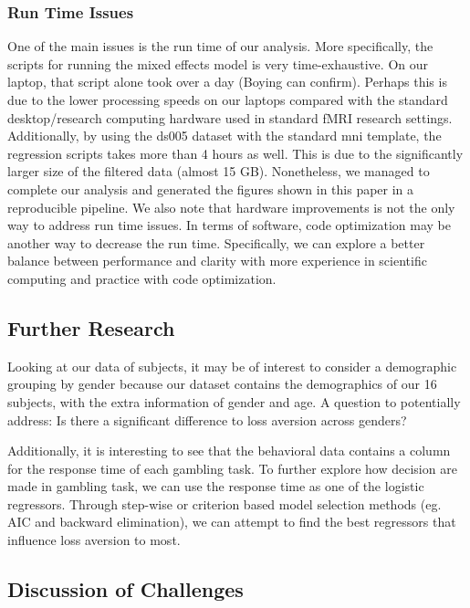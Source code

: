 \documentclass[11pt]{article}
\begin{document}
\subsubsection{Run Time Issues}

One of the main issues is the run time of our analysis. More specifically, 
the scripts for running the mixed effects model is very time-exhaustive. On
our laptop, that script alone took over a day (Boying can confirm). Perhaps
this is due to the lower processing speeds on our laptops compared with the
standard desktop/research computing hardware used in standard fMRI research
settings. Additionally, by using the ds005 dataset with the standard mni 
template, the regression scripts takes more than 4 hours as well. This is due
to the significantly larger size of the filtered data (almost 15 GB). 
Nonetheless, we managed to complete our analysis and generated the figures 
shown in this paper in a reproducible pipeline. We also note that hardware 
improvements is not the only way to address run time issues. In terms of 
software, code optimization may be another way to decrease the run time. 
Specifically, we can explore a better balance between performance and clarity
with more experience in scientific computing and practice with code 
optimization.

\subsection{Further Research}

\par Looking at our data of subjects, it may be of interest to consider a 
demographic grouping by gender because our dataset contains the demographics of 
our 16 subjects, with the extra information of gender and age. A question to 
potentially address: Is there a significant difference to loss aversion across
genders?

\par Additionally, it is interesting to see that the behavioral data contains a 
column for the response time of each gambling task. To further explore how 
decision are made in gambling task, we can use the response time as one of the 
logistic regressors. Through step-wise or criterion based model selection 
methods (eg. AIC and backward elimination), we can attempt to find the best 
regressors that influence loss aversion to most.

\subsection{Discussion of Challenges}
\end{document}

